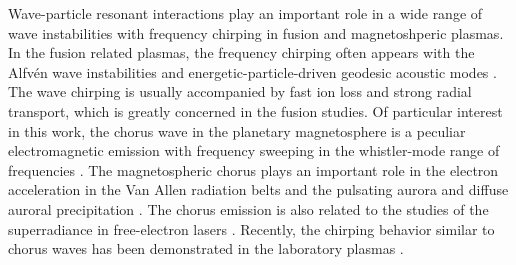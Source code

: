 Wave-particle resonant interactions play an important role  in a wide range of wave instabilities with frequency chirping in fusion and magnetoshperic plasmas.
In the fusion related plasmas, the frequency chirping often appears with the Alfv\'en wave instabilities \cite{chen2016,wang2018,wang2012,wang2012a,breizman2010,lilley2010} and energetic-particle-driven geodesic acoustic modes \cite{wang2013}.
The wave chirping is usually accompanied by fast ion loss and strong radial transport, which is greatly concerned in the fusion studies.
 Of particular interest in this work, 
the chorus wave
in the planetary magnetosphere
is a peculiar electromagnetic emission with frequency sweeping in the whistler-mode range of frequencies \cite{helliwell1965whistlers,burtis_magnetospheric_1976,tsurutani_postmidnight_1974}. 
The  magnetospheric chorus  plays an important role in the electron acceleration   in the Van Allen radiation belts \cite{horne_wave_2005,thorne_rapid_2013,reeves_electron_2013} and the pulsating aurora  and diffuse auroral precipitation \cite{nishimura_identifying_2010,kasahara_pulsating_2018,thorne_scattering_2010}.
The chorus emission is also related to  the studies of the superradiance in free-electron lasers \cite{zonca_nonlinear_2021, soto-chavez2012}.
Recently,
the chirping behavior similar to chorus waves has  been demonstrated in the laboratory plasmas \cite{vancompernolle2015,saitoh2024}.

